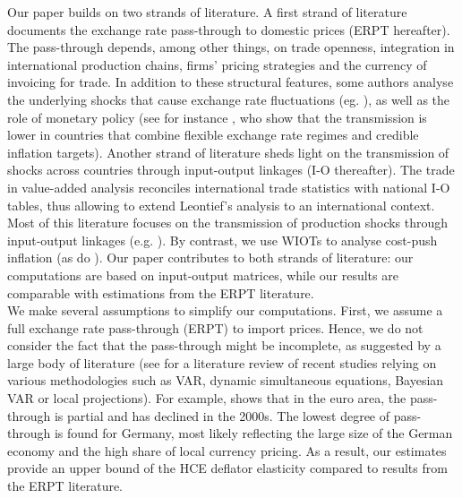 \documentclass[11pt,a4paper]{paper} %
\begin{document}
Our paper builds on two strands of literature. 
A first strand of literature documents the exchange rate pass-through to domestic prices (ERPT hereafter). 
The pass-through depends, among other things, on trade openness, integration in international production chains, firms' pricing strategies and the currency of invoicing for trade.
In addition to these structural features, some authors analyse the underlying shocks that cause exchange rate fluctuations (eg. \cite{Forbes2018}), as well as the role of monetary policy (see for instance \cite{Ha2020}, who show that the transmission is lower in countries that combine flexible exchange rate regimes and credible inflation targets). 
Another strand of literature sheds light on the transmission of shocks across countries through input-output linkages (I-O thereafter).
The trade in value-added analysis reconciles international trade statistics with national I-O tables, thus allowing to extend Leontief's analysis \citep{Leontief1951} to an international context.
Most of this literature focuses on the transmission of production shocks through input-output linkages (e.g. \cite{Johnson2014, Eaton2016}).
By contrast, we use WIOTs to analyse cost-push inflation (as do \cite{Aydogus2018}).
Our paper contributes to both strands of literature: our computations are based on input-output matrices, while our results are comparable with estimations from the ERPT literature. \\
We make several assumptions to simplify our computations. 
First, we assume a full exchange rate pass-through (ERPT) to import prices. 
Hence, we do not consider the fact that the pass-through might be incomplete, as suggested by a large body of literature (see \cite{Ortega2020} for a literature review of recent studies relying on various methodologies such as VAR, dynamic simultaneous equations, Bayesian VAR or local projections). 
For example, \cite{Ozyurt2016} shows that in the euro area, the pass-through is partial and has declined in the 2000s. The lowest degree of pass-through is found for Germany, most likely reflecting the large size of the German economy and the high share of local currency pricing. 
As a result, our estimates provide an upper bound of the HCE deflator elasticity compared to results from the ERPT literature. 
\end{document}
